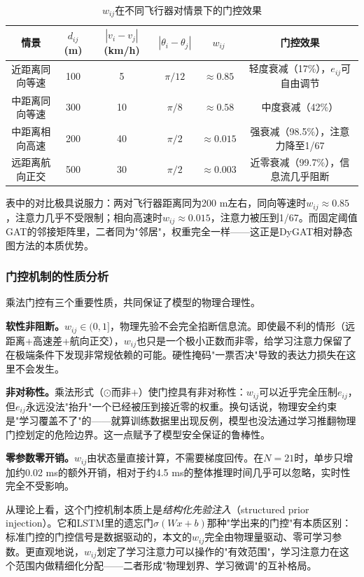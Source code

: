 \documentclass[12pt,a4paper,UTF8]{ctexart}
\begin{document}
\begin{table}[H]
    \centering\small
    \caption{$w_{ij}$在不同飞行器对情景下的门控效果}
    \label{tab:gating}
    \begin{tabular}{|c|c|c|c|c|c|}
        \hline
        \textbf{情景} & $d_{ij}$(m) & $|v_i-v_j|$(km/h) & $|\theta_i-\theta_j|$ & $w_{ij}$ & \textbf{门控效果} \\
        \hline
        近距离同向等速 & 100 & 5 & $\pi/12$ & $\approx0.85$ & 轻度衰减（17\%），$e_{ij}$可自由调节 \\
        中距离同向等速 & 300 & 10 & $\pi/8$ & $\approx0.58$ & 中度衰减（42\%） \\
        中距离相向高速 & 200 & 40 & $\pi/2$ & $\approx0.015$ & 强衰减（98.5\%），注意力降至1/67 \\
        远距离航向正交 & 500 & 30 & $\pi/2$ & $\approx0.003$ & 近零衰减（99.7\%），信息流几乎阻断 \\
        \hline
    \end{tabular}
\end{table}

表中的对比极具说服力：两对飞行器距离同为200 m左右，同向等速时$w_{ij}\approx0.85$，注意力几乎不受限制；相向高速时$w_{ij}\approx0.015$，注意力被压到1/67。而固定阈值GAT的邻接矩阵里，二者同为"邻居"，权重完全一样——这正是DyGAT相对静态图方法的本质优势。

\subsubsection{门控机制的性质分析}

乘法门控有三个重要性质，共同保证了模型的物理合理性。

\textbf{软性非阻断。}$w_{ij}\in(0,1]$，物理先验不会完全掐断信息流。即使最不利的情形（远距离+高速差+航向正交），$w_{ij}$也只是一个极小正数而非零，给学习注意力保留了在极端条件下发现非常规依赖的可能。硬性掩码"一票否决"导致的表达力损失在这里不会发生。

\textbf{非对称性。}乘法形式（$\odot$而非$+$）使门控具有非对称性：$w_{ij}$可以近乎完全压制$e_{ij}$，但$e_{ij}$永远没法"抬升"一个已经被压到接近零的权重。换句话说，物理安全约束是"学习覆盖不了"的——就算训练数据里出现反例，模型也没法通过学习推翻物理门控划定的危险边界。这一点赋予了模型安全保证的鲁棒性。

\textbf{零参数零开销。}$w_{ij}$由状态量直接计算，不需要梯度回传。在$N=21$时，单步只增加约0.02 ms的额外开销，相对于约4.5 ms的整体推理时间几乎可以忽略，实时性完全不受影响。

从理论上看，这个门控机制本质上是\emph{结构化先验注入}（structured prior injection）。它和LSTM里的遗忘门$\sigma(Wx+b)$那种"学出来的门控"有本质区别：标准门控的门控信号是数据驱动的，本文的$w_{ij}$完全由物理量驱动、零可学习参数。更直观地说，$w_{ij}$划定了学习注意力可以操作的"有效范围"，学习注意力在这个范围内做精细化分配——二者形成"物理划界、学习微调"的互补格局。
\end{document}
